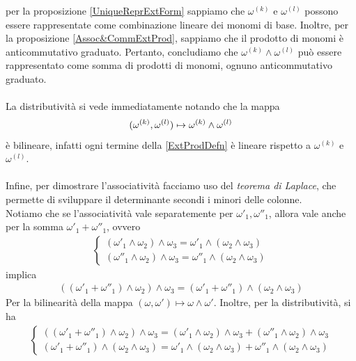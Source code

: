 \documentclass[twoside, 11pt]{amsbook}
\makeatletter
\newcommand{\0}{{(0)}}
\newcommand{\3}{{(3)}}
\theoremstyle{colonplain}
\theoremstyle{colondefinition}
\theoremstyle{colonremark}
\numberwithin{equation}{chapter}
\renewcommand{\proofname}{Dimostrazione}
\renewenvironment{proof}[1][\proofname]{\par
  \pushQED{\qed}%
  \normalfont \topsep6\p@\@plus6\p@\relax
  \trivlist
  \item[\hskip\labelsep\bfseries #1:]\ignorespaces
}{%
  \popQED\endtrivlist\@endpefalse
}
\makeatother
\begin{document}
\begin{proof} per la proposizione \ref{UniqueReprExtForm} sappiamo che $\omega^{(k)}$ e $\omega^{(l)}$ possono essere rappresentate come combinazione lineare dei monomi di base. Inoltre, per la proposizione \ref{Assoc&CommExtProd}, sappiamo che il prodotto di monomi è anticommutativo graduato. Pertanto, concludiamo che $\omega^{(k)} \wedge \omega^{(l)}$ può essere rappresentato come somma di prodotti di monomi, ognuno anticommutativo graduato. \\ \\
La distributività si vede immediatamente notando che la mappa
\begin{align}
    (\omega^{(k)}, \omega^{(l)}) \mapsto \omega^{(k)} \wedge \omega^{(l)} \notag
\end{align}
è bilineare, infatti ogni termine della \eqref{ExtProdDefn} è lineare rispetto a $\omega^{(k)}$ e $\omega^{(l)}$. \\ \\
Infine, per dimostrare l'associatività facciamo uso del \textit{teorema di Laplace}, che permette di sviluppare il determinante secondi i minori delle colonne. \\
Notiamo che se l'associatività vale separatemente per $\omega'_1, \omega''_1$, allora vale anche per la somma $\omega'_1 + \omega''_1$, ovvero 
\begin{align}
    \begin{cases}
        (\omega'_1 \wedge \omega_2) \wedge \omega_3 = \omega'_1 \wedge (\omega_2 \wedge \omega_3) \\
        (\omega''_1 \wedge \omega_2) \wedge \omega_3 = \omega''_1 \wedge (\omega_2 \wedge \omega_3)
    \end{cases} 
\end{align}
implica
\begin{align}
    ((\omega'_1 + \omega''_1) \wedge \omega_2) \wedge \omega_3 = (\omega'_1 + \omega''_1) \wedge (\omega_2 \wedge \omega_3) 
\end{align}
Per la bilinearità della mappa $(\omega, \omega') \mapsto \omega \wedge \omega'$. Inoltre, per la distributività, si ha 
\begin{align}
    \begin{cases}
        ((\omega'_1 + \omega''_1) \wedge \omega_2) \wedge \omega_3 = (\omega'_1 \wedge \omega_2) \wedge \omega_3 + (\omega''_1 \wedge \omega_2) \wedge \omega_3 \\
        (\omega'_1 + \omega''_1) \wedge (\omega_2 \wedge \omega_3) = \omega'_1 \wedge (\omega_2 \wedge \omega_3) + \omega''_1 \wedge (\omega_2 \wedge \omega_3)

\end{cases}
\end{align}
\end{proof}
\end{document}

